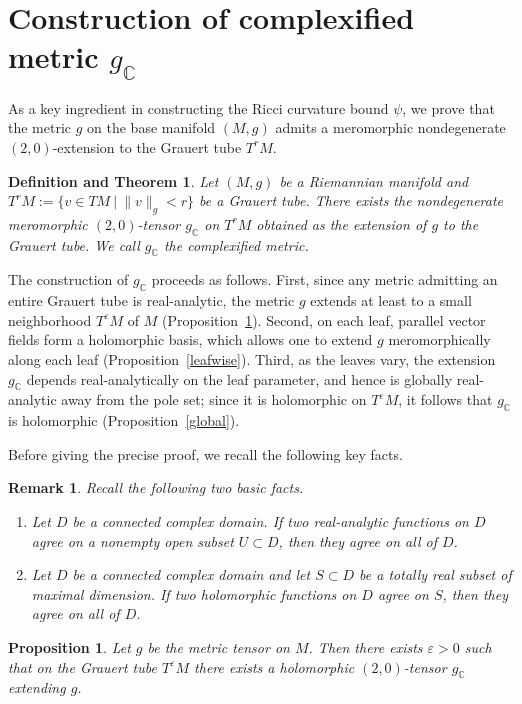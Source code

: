\documentclass[a4paper, 12pt]{article}
\newcommand{\gC}{g_{\mathbb{C}}}
\newtheorem{prop}[thm]{Proposition}
\newtheorem{dfnthm}[thm]{Definition and Theorem}
\newtheorem{rem}[thm]{Remark}
\begin{document}
\section{Construction of complexified metric $\gC$}\label{kcon}
As a key ingredient in constructing the Ricci curvature bound $\psi$, we prove that the metric $g$ on the base manifold $(M,g)$ admits a meromorphic nondegenerate $(2,0)$-extension to the Grauert tube $T^r M$.
\begin{dfnthm}\label{LS}
Let $(M,g)$ be a Riemannian manifold and $T^r M:=\{v \in TM~|~\|v\|_g<r\}$ be a Grauert tube. There exists the nondegenerate meromorphic $(2,0)$-tensor $\gC$ on $T^rM$ obtained as the extension of $g$ to the Grauert tube. We call $\gC$ the \emph{complexified metric}.
\end{dfnthm}
The construction of $\gC$ proceeds as follows. First, since any metric admitting an entire Grauert tube is real-analytic, the metric $g$ extends at least to a small neighborhood $T^\varepsilon M$ of $M$ (Proposition~\ref{epsilon}). Second, on each leaf, parallel vector fields form a holomorphic basis, which allows one to extend $g$ meromorphically along each leaf (Proposition~\ref{leafwise}). Third, as the leaves vary, the extension $\gC$ depends real-analytically on the leaf parameter, and hence is globally real-analytic away from the pole set; since it is holomorphic on $T^\varepsilon M$, it follows that $\gC$ is holomorphic (Proposition~\ref{global}).

Before giving the precise proof, we recall the following key facts.
\begin{rem}\label{continue}
Recall the following two basic facts.
\begin{enumerate}[label=(\arabic*), leftmargin=2.2em]
\item Let $D$ be a connected complex domain. If two real-analytic functions on $D$ agree on a nonempty open subset $U \subset D$,
then they agree on all of $D$.
\item Let $D$ be a connected complex domain and let $S \subset D$ be a totally real subset of maximal dimension.
If two holomorphic functions on $D$ agree on $S$, then they agree on all of $D$.
\end{enumerate}
\end{rem}
\begin{prop}\label{epsilon}
Let $g$ be the metric tensor on $M$. Then there exists $\varepsilon>0$ such that on the Grauert tube $T^\varepsilon M$ there exists a holomorphic $(2,0)$-tensor $\gC$ extending $g$.
\end{prop}
\end{document}

